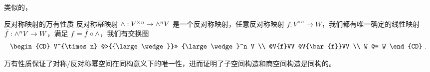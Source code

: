 类似的，
\begin{theorem}{反对称映射的万有性质}
反对称幂映射 ${\large \wedge}: V^{\times n} \to {\large \wedge}^n V$ 是一个反对称映射，任意反对称映射 $f: V^{\times n} \to W$，我们都有唯一确定的线性映射 $\bar{f}: {\large \wedge}^n V \to W$，满足 $f = \bar{f} \circ {\large \wedge}$，我们有交换图
\begin{equation}
\begin{CD}
V^{\times n} @>{{\large \wedge}}>> {\large \wedge}^n V \\
@V{f}VV @V{\bar{f}}VV \\
W @= W
\end{CD}~.
\end{equation}
\end{theorem}

万有性质保证了对称/反对称幂空间在同构意义下的唯一性，进而证明了子空间构造和商空间构造是同构的。